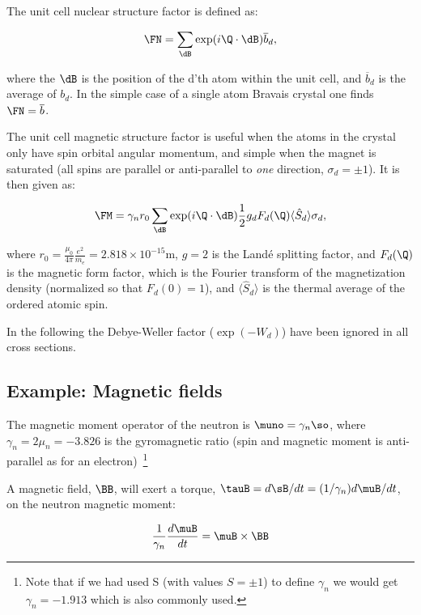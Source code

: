 The unit cell nuclear structure factor is defined as:

\begin{equation}
  \FN = \sum_\dB
  \exp(i\Q \cdot \dB)\overline{b}_d,
\end{equation}

where the $\dB$ is the position of the d'th atom within the unit cell,
and $\overline{b}_d$ is the average of $b_d$. In the simple case of a
single atom Bravais crystal one finds $\FN = \overline{b}$.

The unit cell magnetic structure factor is useful when the atoms in
the crystal only have spin orbital angular momentum, and simple when
the magnet is saturated (all spins are parallel or anti-parallel to
\emph{one} direction, $\sigma_d=\pm1$). It is then given as:

\begin{equation}
  \FM =
  \gamma_n r_0 \sum_\dB \exp(i\Q \cdot \dB)\frac{1}{2}g_d F_d(\Q)\langle
  \hat{S}_d\rangle \sigma_d,
\end{equation}

where $r_0=\frac{\mu_0}{4\pi}\frac{e^2}{m_e} = 2.818 \times 10^{-15}$m, $g=2$ is the
Land{\'e} splitting factor, and $F_d(\Q)$ is the magnetic form factor, which
is the Fourier transform of the magnetization density (normalized so that
$F_d(0) = 1$), and $\langle \hat{S}_d\rangle$ is the thermal average of the
ordered atomic spin.

In the following the Debye-Weller factor ($\exp(-W_d)$) have been ignored in
all cross sections.

\subsection{Example: Magnetic fields}

The magnetic moment operator of the neutron is $\muno = \gamma_n \so$, where
$\gamma_n = 2 \mu_n = -3.826$ is the gyromagnetic ratio (spin and magnetic
moment is anti-parallel as for an electron)~\footnote{Note that if we had used
S (with values $S=\pm 1$) to define $\gamma_n$ we would get $\gamma_n =
-1.913$ which is also commonly used.}

A magnetic field, $\BB$, will exert a torque, $\tauB = d\sB/dt = (1/\gamma_n)d\muB/dt$, on the neutron magnetic moment:

\begin{equation}
  \label{eq:torque}
  \frac{1}{\gamma_n} \frac{d\muB}{dt} = \muB \times \BB
\end{equation}

